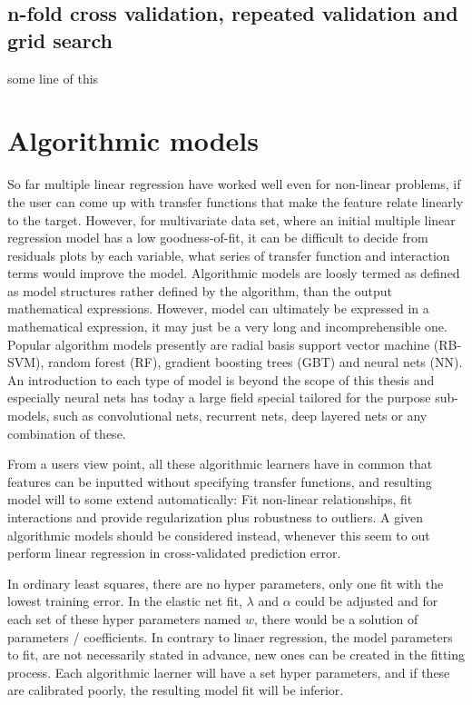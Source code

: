 \subsection{n-fold cross validation, repeated validation and grid search}
some line of this

\cite{krstajic2014cross}

\section{Algorithmic models}
So far multiple linear regression have worked well even for non-linear problems, if the user can come up with transfer functions that make the feature relate linearly to the target. However, for multivariate data set, where an initial multiple linear regression model has a low goodness-of-fit, it can be difficult to decide from residuals plots by each variable, what series of transfer function and interaction terms would improve the model. Algorithmic models are loosly termed as defined as model structures rather defined by the algorithm, than the output mathematical expressions. However, model can ultimately be expressed in a mathematical expression, it may just be a very long and incomprehensible one. Popular algorithm models presently are radial basis support vector machine (RB-SVM), random forest (RF), gradient boosting trees (GBT) and neural nets (NN). An introduction to each type of model is beyond the scope of this thesis and especially neural nets has today a large field special tailored for the purpose sub-models, such as convolutional nets, recurrent nets, deep layered nets or any combination of these. 

From a users view point, all these algorithmic learners have in common that features can be inputted without specifying transfer functions, and resulting model will to some extend automatically: Fit non-linear relationships, fit interactions and provide regularization plus robustness to outliers. A given algorithmic models should be considered instead, whenever this seem to out perform linear regression in cross-validated prediction error.

In ordinary least squares, there are no hyper parameters, only one fit with the lowest training error. In the elastic net fit, $\lambda$ and $\alpha$ could be adjusted and for each set of these hyper parameters named $w$, there would be a solution of parameters / coefficients. In contrary to linaer regression, the model parameters to fit, are not necessarily stated in advance, new ones can be created in the fitting process. Each algorithmic laerner will have a set hyper parameters, and if these are calibrated poorly, the resulting model fit will be inferior.


